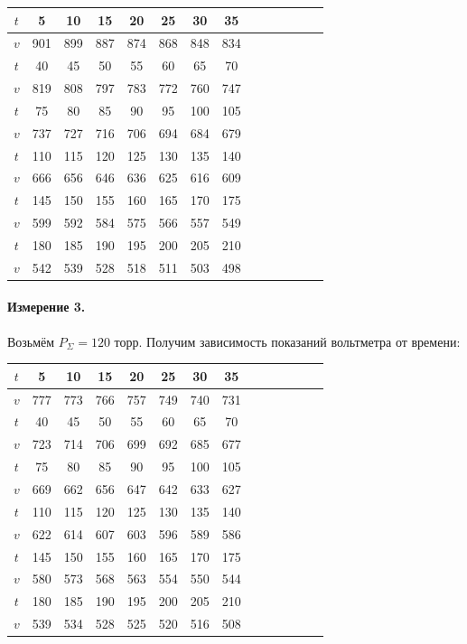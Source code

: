 \documentclass[a4paper,12pt]{article} %
\begin{document}
\begin{center}
\begin{tabular}{|c||c|c|c|c|c|c|c|c|c|c|c|c|c|}
\hline
$t$ & 5 & 10 & 15 & 20 & 25 & 30 & 35 \\ 
\hline
$v$ & 901 & 899 & 887 & 874 & 868 & 848 & 834 \\ 
\hline
\hline
$t$ & 40 & 45 & 50 & 55 & 60 & 65 & 70 \\ 
\hline
$v$ & 819 & 808 & 797 & 783 & 772 & 760 & 747 \\ 
\hline
\hline
$t$ & 75 & 80 & 85 & 90 & 95 & 100 & 105 \\ 
\hline
$v$ & 737 & 727 & 716 & 706 & 694 & 684 & 679 \\ 
\hline
\hline
$t$ & 110 & 115 & 120 & 125 & 130 & 135 & 140 \\ 
\hline
$v$ & 666 & 656 & 646 & 636 & 625 & 616 & 609 \\ 
\hline
\hline
$t$ & 145 & 150 & 155 & 160 & 165 & 170 & 175 \\ 
\hline
$v$ & 599 & 592 & 584 & 575 & 566 & 557 & 549 \\ 
\hline
\hline
$t$ & 180 & 185 & 190 & 195 & 200 & 205 & 210 \\ 
\hline
$v$ & 542 & 539 & 528 & 518 & 511 & 503 & 498 \\ 
\hline
\end{tabular}
\end{center}

\paragraph{Измерение 3.}
Возьмём $P_\Sigma = 120$ торр. Получим зависимость показаний вольтметра от времени:


\begin{center}
\begin{tabular}{|c||c|c|c|c|c|c|c|c|c|c|c|c|c|}
\hline
$t$ & 5 & 10 & 15 & 20 & 25 & 30 & 35 \\ 
\hline
$v$ & 777 & 773 & 766 & 757 & 749 & 740 & 731 \\ 
\hline
\hline
$t$ & 40 & 45 & 50 & 55 & 60 & 65 & 70 \\ 
\hline
$v$ & 723 & 714 & 706 & 699 & 692 & 685 & 677 \\ 
\hline
\hline
$t$ & 75 & 80 & 85 & 90 & 95 & 100 & 105 \\ 
\hline
$v$ & 669 & 662 & 656 & 647 & 642 & 633 & 627 \\ 
\hline
\hline
$t$ & 110 & 115 & 120 & 125 & 130 & 135 & 140 \\ 
\hline
$v$ & 622 & 614 & 607 & 603 & 596 & 589 & 586 \\ 
\hline
\hline
$t$ & 145 & 150 & 155 & 160 & 165 & 170 & 175 \\ 
\hline
$v$ & 580 & 573 & 568 & 563 & 554 & 550 & 544 \\ 
\hline
\hline
$t$ & 180 & 185 & 190 & 195 & 200 & 205 & 210 \\ 
\hline
$v$ & 539 & 534 & 528 & 525 & 520 & 516 & 508 \\ 
\hline
\end{tabular}
\end{center}
\end{document}
